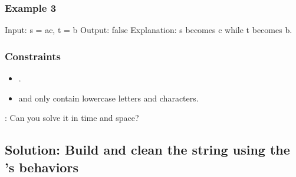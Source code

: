 \documentclass[letterpaper,12pt,english]{book}
\begin{document}
\subsubsection{Example 3}
\label{\detokenize{Stack/844_Backspace_String_Compare:example-3}}
\begin{sphinxVerbatim}[commandchars=\\\{\}]
Input: s = \PYGZdq{}a\PYGZsh{}c\PYGZdq{}, t = \PYGZdq{}b\PYGZdq{}
Output: false
Explanation: s becomes \PYGZdq{}c\PYGZdq{} while t becomes \PYGZdq{}b\PYGZdq{}.
\end{sphinxVerbatim}


\subsubsection{Constraints}
\label{\detokenize{Stack/844_Backspace_String_Compare:constraints}}\begin{itemize}
\item {} 
\sphinxAtStartPar
{}.

\item {} 
\sphinxAtStartPar
{} and  only contain lowercase letters and \sphinxcode{\sphinxupquote{\textquotesingle{}\#\textquotesingle{}}} characters.

\end{itemize}

\sphinxAtStartPar
{}: Can you solve it in  time and  space?


\subsection{Solution: Build and clean the string using the ’s behaviors}
\label{\detokenize{Stack/844_Backspace_String_Compare:solution-build-and-clean-the-string-using-the-stack-s-behaviors}}
\end{document}
